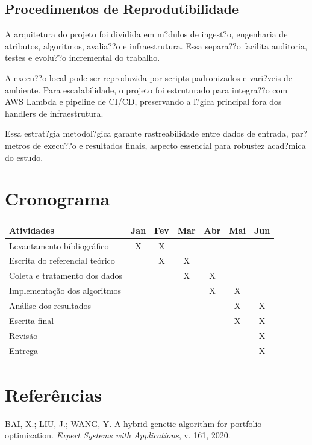 ﻿\documentclass[
  12pt,
  oneside,
  a4paper,
  brazil
]{abntex2}
\begin{document}
\section{Procedimentos de Reprodutibilidade}
A arquitetura do projeto foi dividida em m?dulos de ingest?o, engenharia de atributos, algoritmos, avalia??o e infraestrutura. Essa separa??o facilita auditoria, testes e evolu??o incremental do trabalho.

A execu??o local pode ser reproduzida por scripts padronizados e vari?veis de ambiente. Para escalabilidade, o projeto foi estruturado para integra??o com AWS Lambda e pipeline de CI/CD, preservando a l?gica principal fora dos handlers de infraestrutura.

Essa estrat?gia metodol?gica garante rastreabilidade entre dados de entrada, par?metros de execu??o e resultados finais, aspecto essencial para robustez acad?mica do estudo.
\chapter{Cronograma}
\begin{center}
\renewcommand{\arraystretch}{1.3}
\begin{tabular}{|p{6.5cm}|c|c|c|c|c|c|}
\hline
\textbf{Atividades} & \textbf{Jan} & \textbf{Fev} & \textbf{Mar} & \textbf{Abr} & \textbf{Mai} & \textbf{Jun} \\
\hline
Levantamento bibliográfico & X & X &  &  &  &  \\
\hline
Escrita do referencial teórico &  & X & X &  &  &  \\
\hline
Coleta e tratamento dos dados &  &  & X & X &  &  \\
\hline
Implementação dos algoritmos &  &  &  & X & X &  \\
\hline
Análise dos resultados &  &  &  &  & X & X \\
\hline
Escrita final &  &  &  &  & X & X \\
\hline
Revisão &  &  &  &  &  & X \\
\hline
Entrega &  &  &  &  &  & X \\
\hline
\end{tabular}
\end{center}

\postextual
\chapter*{Referências}

BAI, X.; LIU, J.; WANG, Y. A hybrid genetic algorithm for portfolio optimization. \textit{Expert Systems with Applications}, v. 161, 2020.
\end{document}
